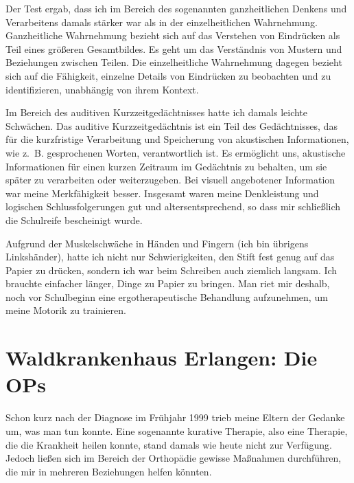 \documentclass[fontsize=14pt,a4paper,headinclude,DIV=calc,automark]{scrbook}
\begin{document}
Der Test ergab, dass ich im Bereich des sogenannten ganzheitlichen Denkens und Verarbeitens damals stärker war als in der einzelheitlichen Wahrnehmung. Ganzheitliche Wahrnehmung bezieht sich auf das Verstehen von Eindrücken als Teil eines größeren Gesamtbildes. Es geht um das Verständnis von Mustern und Beziehungen zwischen Teilen. Die einzelheitliche Wahrnehmung dagegen bezieht sich auf die Fähigkeit, einzelne Details von Eindrücken zu beobachten und zu identifizieren, unabhängig von ihrem Kontext.

Im Bereich des auditiven Kurzzeitgedächtnisses hatte ich damals leichte Schwächen. Das auditive Kurzzeitgedächtnis ist ein Teil des Gedächtnisses, das für die kurzfristige Verarbeitung und Speicherung von akustischen Informationen, wie z.~B. gesprochenen Worten, verantwortlich ist. Es ermöglicht uns, akustische Informationen für einen kurzen Zeitraum im Gedächtnis zu behalten, um sie später zu verarbeiten oder weiterzugeben. Bei visuell angebotener Information war meine Merkfähigkeit besser. Insgesamt waren meine Denkleistung und logischen Schlussfolgerungen gut und altersentsprechend, so dass mir schließlich die Schulreife bescheinigt wurde.

Aufgrund der Muskelschwäche in Händen und Fingern (ich bin übrigens Linkshänder), hatte ich nicht nur Schwierigkeiten, den Stift fest genug auf das Papier zu drücken, sondern ich war beim Schreiben auch ziemlich langsam. Ich brauchte einfacher länger, Dinge zu Papier zu bringen. Man riet mir deshalb, noch vor Schulbeginn eine ergotherapeutische Behandlung aufzunehmen, um meine Motorik zu trainieren.

\section{Waldkrankenhaus Erlangen: Die OPs}

Schon kurz nach der Diagnose im Frühjahr 1999 trieb meine Eltern der Gedanke um, was man tun konnte. Eine sogenannte kurative Therapie, also eine Therapie, die die Krankheit heilen konnte, stand damals wie heute nicht zur Verfügung. Jedoch ließen sich im Bereich der Orthopädie gewisse Maßnahmen durchführen, die mir in mehreren Beziehungen helfen könnten.
\end{document}
